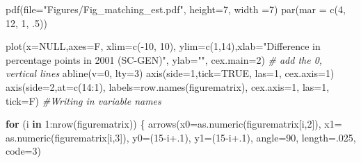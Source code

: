 \documentclass[
]{article}
\newenvironment{Shaded}{\begin{snugshade}}{\end{snugshade}}
\newcommand{\AttributeTok}[1]{\textcolor[rgb]{0.77,0.63,0.00}{#1}}
\newcommand{\CommentTok}[1]{\textcolor[rgb]{0.56,0.35,0.01}{\textit{#1}}}
\newcommand{\ConstantTok}[1]{\textcolor[rgb]{0.00,0.00,0.00}{#1}}
\newcommand{\ControlFlowTok}[1]{\textcolor[rgb]{0.13,0.29,0.53}{\textbf{#1}}}
\newcommand{\DecValTok}[1]{\textcolor[rgb]{0.00,0.00,0.81}{#1}}
\newcommand{\FloatTok}[1]{\textcolor[rgb]{0.00,0.00,0.81}{#1}}
\newcommand{\FunctionTok}[1]{\textcolor[rgb]{0.00,0.00,0.00}{#1}}
\newcommand{\NormalTok}[1]{#1}
\newcommand{\SpecialCharTok}[1]{\textcolor[rgb]{0.00,0.00,0.00}{#1}}
\newcommand{\StringTok}[1]{\textcolor[rgb]{0.31,0.60,0.02}{#1}}
\begin{document}
\begin{Shaded}
\begin{Highlighting}[]
\FunctionTok{pdf}\NormalTok{(}\AttributeTok{file=}\StringTok{"Figures/Fig\_matching\_est.pdf"}\NormalTok{, }\AttributeTok{height=}\DecValTok{7}\NormalTok{, }\AttributeTok{width =}\DecValTok{7}\NormalTok{)}
\FunctionTok{par}\NormalTok{(}\AttributeTok{mar =} \FunctionTok{c}\NormalTok{(}\DecValTok{4}\NormalTok{, }\DecValTok{12}\NormalTok{, }\DecValTok{1}\NormalTok{, .}\DecValTok{5}\NormalTok{))}

\FunctionTok{plot}\NormalTok{(}\AttributeTok{x=}\ConstantTok{NULL}\NormalTok{,}\AttributeTok{axes=}\NormalTok{F, }\AttributeTok{xlim=}\FunctionTok{c}\NormalTok{(}\SpecialCharTok{{-}}\DecValTok{10}\NormalTok{, }\DecValTok{10}\NormalTok{), }\AttributeTok{ylim=}\FunctionTok{c}\NormalTok{(}\DecValTok{1}\NormalTok{,}\DecValTok{14}\NormalTok{),}\AttributeTok{xlab=}\StringTok{"Difference in percentage points in 2001 (SC{-}GEN)"}\NormalTok{, }\AttributeTok{ylab=}\StringTok{""}\NormalTok{, }\AttributeTok{cex.main=}\DecValTok{2}\NormalTok{)}
\CommentTok{\# add the 0, vertical lines}
\FunctionTok{abline}\NormalTok{(}\AttributeTok{v=}\DecValTok{0}\NormalTok{, }\AttributeTok{lty=}\DecValTok{3}\NormalTok{)}
\FunctionTok{axis}\NormalTok{(}\AttributeTok{side=}\DecValTok{1}\NormalTok{,}\AttributeTok{tick=}\ConstantTok{TRUE}\NormalTok{, }\AttributeTok{las=}\DecValTok{1}\NormalTok{, }\AttributeTok{cex.axis=}\DecValTok{1}\NormalTok{)}
\FunctionTok{axis}\NormalTok{(}\AttributeTok{side=}\DecValTok{2}\NormalTok{,}\AttributeTok{at=}\FunctionTok{c}\NormalTok{(}\DecValTok{14}\SpecialCharTok{:}\DecValTok{1}\NormalTok{), }\AttributeTok{labels=}\FunctionTok{row.names}\NormalTok{(figurematrix), }\AttributeTok{cex.axis=}\DecValTok{1}\NormalTok{, }\AttributeTok{las=}\DecValTok{1}\NormalTok{, }\AttributeTok{tick=}\NormalTok{F)}
\CommentTok{\#Writing in variable names}

\ControlFlowTok{for}\NormalTok{ (i }\ControlFlowTok{in} \DecValTok{1}\SpecialCharTok{:}\FunctionTok{nrow}\NormalTok{(figurematrix)) \{}
\FunctionTok{arrows}\NormalTok{(}\AttributeTok{x0=}\FunctionTok{as.numeric}\NormalTok{(figurematrix[i,}\DecValTok{2}\NormalTok{]), }\AttributeTok{x1=} \FunctionTok{as.numeric}\NormalTok{(figurematrix[i,}\DecValTok{3}\NormalTok{]), }\AttributeTok{y0=}\NormalTok{(}\DecValTok{15}\SpecialCharTok{{-}}\NormalTok{i}\FloatTok{+.1}\NormalTok{), }\AttributeTok{y1=}\NormalTok{(}\DecValTok{15}\SpecialCharTok{{-}}\NormalTok{i}\FloatTok{+.1}\NormalTok{), }\AttributeTok{angle=}\DecValTok{90}\NormalTok{, }\AttributeTok{length=}\NormalTok{.}\DecValTok{025}\NormalTok{, }\AttributeTok{code=}\DecValTok{3}\NormalTok{)}


\end{Highlighting}
\end{Shaded}
\end{document}
